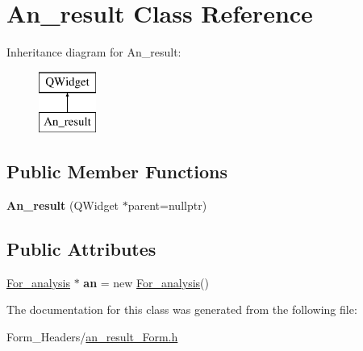 \hypertarget{class_an__result}{}\section{An\+\_\+result Class Reference}
\label{class_an__result}
Inheritance diagram for An\+\_\+result\+:\begin{figure}[H]
\begin{center}
\leavevmode
\includegraphics[height=2.000000cm]{class_an__result}
\end{center}
\end{figure}
\subsection*{Public Member Functions}
\begin{DoxyCompactItemize}
\item 
\mbox{\label{class_an__result_a82090aee268336e10008cf846a1aac7b}} 
{\bfseries An\+\_\+result} (Q\+Widget $\ast$parent=nullptr)
\end{DoxyCompactItemize}
\subsection*{Public Attributes}
\begin{DoxyCompactItemize}
\item 
\mbox{\label{class_an__result_a39e0f4360de9b4699560860e5f5afb63}} 
\mbox{\hyperlink{class_for__analysis}{For\+\_\+analysis}} $\ast$ {\bfseries an} = new \mbox{\hyperlink{class_for__analysis}{For\+\_\+analysis}}()
\end{DoxyCompactItemize}


The documentation for this class was generated from the following file\+:\begin{DoxyCompactItemize}
\item 
Form\+\_\+\+Headers/\mbox{\hyperlink{an__result___form_8h}{an\+\_\+result\+\_\+\+Form.\+h}}\end{DoxyCompactItemize}
